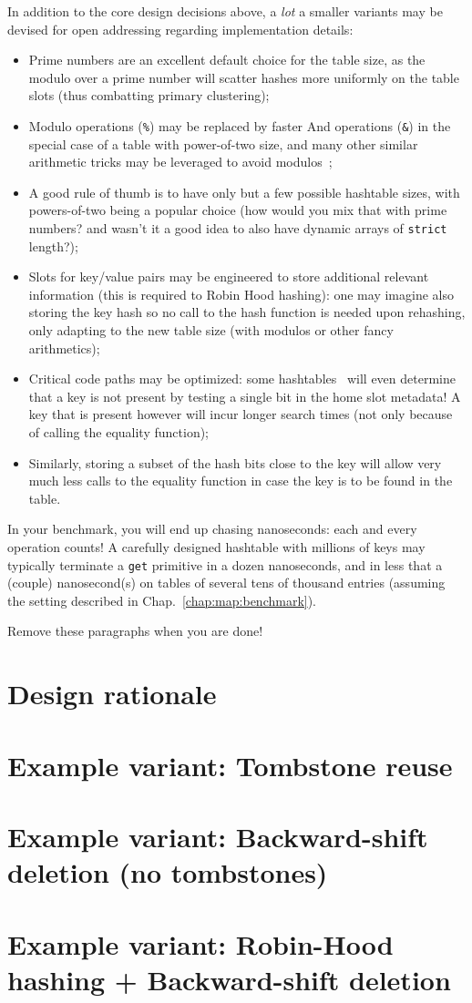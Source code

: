 In addition to the core design decisions above, a \textit{lot} a smaller variants may be devised for open addressing regarding implementation details:
\begin{itemize}
\item Prime numbers are an excellent default choice for the table size, as the modulo over a prime number will scatter hashes more uniformly on the table slots (thus combatting primary clustering);
\item Modulo operations (\texttt{\%}) may be replaced by faster And operations (\texttt{\&}) in the special case of a table with power-of-two size, and many other similar arithmetic tricks may be leveraged to avoid modulos~\cite{skarupke:fibonacci}\cite{lemire:modulo:alternative}\cite{neumann:all:sizes};
\item A good rule of thumb is to have only but a few possible hashtable sizes, with powers-of-two being a popular choice (how would you mix that with prime numbers? and wasn't it a good idea to also have dynamic arrays of \texttt{strict} length?);
\item Slots for key/value pairs may be engineered to store additional relevant information (this is required to Robin Hood hashing): one may imagine also storing the key hash so no call to the hash function is needed upon rehashing, only adapting to the new table size (with modulos or other fancy arithmetics);
\item Critical code paths may be optimized: some hashtables~\cite{jackson:verstable} will even determine that a key is not present by testing a single bit in the home slot metadata! A key that is present however will incur longer search times (not only because of calling the equality function);
\item Similarly, storing a subset of the hash bits close to the key will allow very much less calls to the equality function in case the key is to be found in the table.
\end{itemize}

In your benchmark, you will end up chasing nanoseconds: each and every operation counts! A carefully designed hashtable with millions of keys may typically terminate a \texttt{get} primitive in a dozen nanoseconds, and in less that a (couple) nanosecond(s) on tables of several tens of thousand entries (assuming the setting described in Chap.~\ref{chap:map:benchmark}). 

Remove these paragraphs when you are done!

\section{Design rationale}

\section{Example variant: Tombstone reuse}

\section{Example variant: Backward-shift deletion (no tombstones)}

\section{Example variant: Robin-Hood hashing + Backward-shift deletion}

